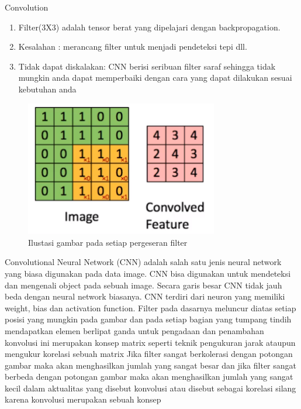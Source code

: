 Convolution
\begin{enumerate}
\item Filter(3X3) adalah tensor berat yang dipelajari dengan backpropagation.
\item Kesalahan : merancang filter untuk menjadi pendeteksi tepi dll.
\item Tidak dapat diskalakan: CNN berisi seribuan filter saraf sehingga tidak mungkin anda dapat memperbaiki dengan cara yang dapat dilakukan sesuai kebutuhan anda
\end{enumerate}

\begin{figure}[!htp]
	\includegraphics[width=0.75\textwidth]{figures/convolusi.PNG}
	\caption{Ilustasi gambar pada setiap pergeseran filter}
	\label{labelgambar}
\end{figure}
	Convolutional Neural Network (CNN) adalah salah satu jenis neural network yang biasa digunakan pada data image. CNN bisa digunakan untuk mendeteksi dan mengenali object pada sebuah image.
Secara garis besar CNN tidak jauh beda dengan neural network biasanya. CNN terdiri dari neuron yang memiliki weight, bias dan activation function.
Filter pada dasarnya meluncur diatas setiap posisi yang mungkin pada gambar dan pada setiap bagian yang tumpang tindih mendapatkan elemen berlipat ganda untuk pengadaan dan penambahan konvolusi ini merupakan konsep matrix seperti teknik pengukuran jarak ataupun mengukur korelasi sebuah matrix 
Jika filter sangat berkolerasi dengan potongan gambar maka akan menghasilkan jumlah yang sangat besar dan jika filter sangat berbeda dengan potongan gambar maka akan menghasilkan jumlah yang sangat kecil dalam aktualitas yang disebut konvolusi atau disebut sebagai korelasi silang karena konvolusi merupakan sebuah konsep 


